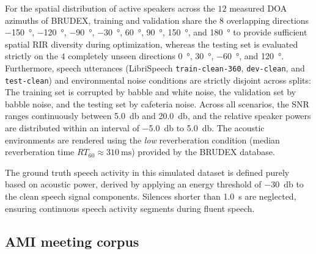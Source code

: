 \documentclass[lettersize,journal]{IEEEtran}
\begin{document}
For the spatial distribution of active speakers across the $12$ measured \gls{DOA} azimuths of \gls{BRUDEX}, training and validation share the $8$ overlapping directions \SI{-150}{\degree}, \SI{-120}{\degree}, \SI{-90}{\degree}, \SI{-30}{\degree}, \SI{60}{\degree}, \SI{90}{\degree}, \SI{150}{\degree}, and \SI{180}{\degree} to provide sufficient spatial \gls{RIR} diversity during optimization, whereas the testing set is evaluated strictly on the $4$ completely unseen directions \SI{0}{\degree}, \SI{30}{\degree}, \SI{-60}{\degree}, and \SI{120}{\degree}.
Furthermore, speech utterances (LibriSpeech \texttt{train-clean-360}, \texttt{dev-clean}, and \texttt{test-clean}) and environmental noise conditions are strictly disjoint across splits:
The training set is corrupted by babble and white noise,
the validation set by babble noise,
and the testing set by cafeteria noise.
Across all scenarios, the \gls{SNR} ranges continuously between \SI{5.0}{\decibel} and \SI{20.0}{\decibel},
and the relative speaker powers are distributed within an interval of \SI{-5.0}{\decibel} to \SI{5.0}{\decibel}.
The acoustic environments are rendered using the \textit{low} reverberation condition
(median reverberation time $RT_{60}\approx \SI{310}{\milli\s}$) provided by the \gls{BRUDEX} database.

The ground truth speech activity in this simulated dataset is defined purely based on acoustic power, derived by applying
an energy threshold of \SI{-30}{\decibel} to the clean speech signal components.
Silences shorter than \SI{1.0}{\second} are neglected, ensuring continuous speech activity segments during fluent speech.


\subsection{AMI meeting corpus}
\end{document}
